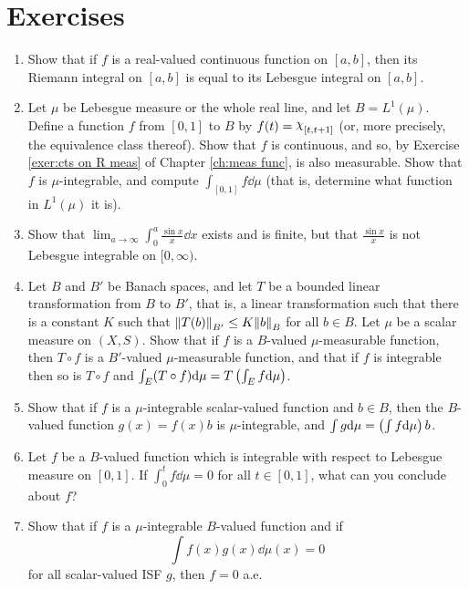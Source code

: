 \section{Exercises}
\begin{enumerate}[label=\arabic*),ref=\arabic*]
\item Show that if $f$ is a real-valued continuous function on $[a,b]$, then its Riemann integral on $[a,b]$ is equal to its Lebesgue integral on $[a,b]$.

\item\label{exer:integral of L1 func}
Let $\mu$ be Lebesgue measure or the whole real line, and let $B=L^1(\mu)$. Define a function $f$ from $[0,1]$ to $B$ by $f(t)=\idf{[t, t+1]}$ (or, more precisely, the equivalence class thereof). Show that $f$ is continuous, and so, by Exercise \ref{exer:cts on R meas} of Chapter \ref{ch:meas func}, is also measurable. Show that $f$ is $\mu$-integrable, and compute $\int_{[0,1]}f\dd\mu$ (that is, determine what function in $L^1(\mu)$ it is).

\item Show that $\lim _{a\to\infty}\int_0^a\frac{\sin x}{x}\dd x$ exists and is finite, but that $\frac{\sin x}{x}$ is not Lebesgue integrable on $[0,\infty)$.

\item\label{exer:integral compose linear functional}
Let $B$ and $B'$ be Banach spaces, and let $T$ be a bounded linear transformation from $B$ to $B'$, that is, a linear transformation such that there is a constant $K$ such that $\norm{T(b)}_{B'}\leq K\norm{b}_B$ for all $b\in B$. Let $\mu$ be a scalar measure on $(X,S)$. Show that if $f$ is a $B$-valued $\mu$-measurable function, then $T\circ f$ is a $B'$-valued $\mu$-measurable function, and that if $f$ is integrable then so is $T\circ f$ and $\int_E(T\circ f)\dd\mu=T\left(\int_Ef\dd\mu\right)$.

\item Show that if $f$ is a $\mu$-integrable scalar-valued function and $b\in B$, then the $B$-valued function $g(x)=f(x)b$ is $\mu$-integrable, and $\int g\dd\mu=\left(\int f\dd\mu\right)b$.

\item Let $f$ be a $B$-valued function which is integrable with respect to Lebesgue measure on $[0,1]$. If $\int_0^t f\dd\mu=0$ for all $t\in[0,1]$, what can you conclude about $f$?

\item Show that if $f$ is a $\mu$-integrable $B$-valued function and if $$\int f(x)g(x)\dd\mu(x)=0$$ for all scalar-valued ISF $g$, then $f=0$ a.e.


\end{enumerate}

